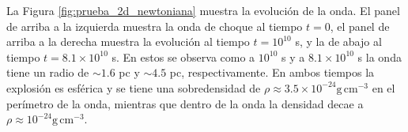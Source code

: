 \documentclass[12pt,a4paper]{book}
\begin{document}
La Figura \ref{fig:prueba_2d_newtoniana} muestra la evolución de la onda. El panel de arriba a la izquierda muestra la onda de choque al tiempo $t = 0$, el panel de arriba a la derecha muestra 
la evolución al tiempo $t = 10^{10}$ s, y la de abajo al tiempo $t =8.1 \times 10^{10}$ s. En estos se observa como a $10^{10}$ s y a $8.1 \times 10^{10}$ s la onda tiene un radio de $\sim 1.6$ pc y $\sim 4.5$ pc, 
respectivamente. En ambos tiempos la explosión es esférica y se tiene una sobredensidad de $\rho \approx 3.5 \times 10^{-24} \text{g} \, \text{cm}^{-3}$ en el perímetro de la onda, mientras que dentro de la onda 
la densidad decae a $\rho \approx 10^{-24} \text{g} \, \text{cm}^{-3}$.

\begin{figure}
  \centering

\end{figure}
\end{document}
